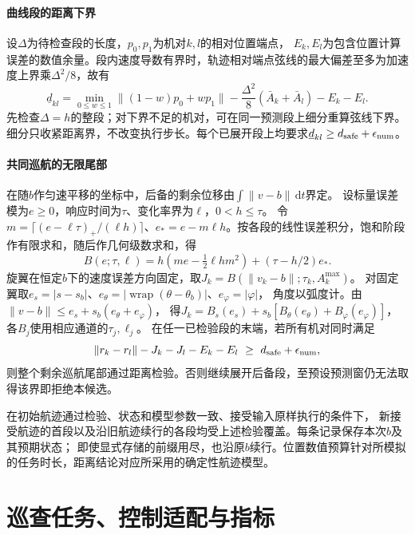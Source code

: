 \documentclass[UTF8,a4paper,11pt,fontset=none]{ctexart}
\begin{document}
\paragraph{曲线段的距离下界}
设$\Delta$为待检查段的长度，$p_0,p_1$为机对$k,l$的相对位置端点，
$E_k,E_l$为包含位置计算误差的数值余量。段内速度导数有界时，轨迹相对端点弦线的最大偏差至多为加速度上界乘$\Delta^2/8$，故有
\begin{equation}
\underline d_{kl}=\min_{0\le w\le1}\|(1-w)p_0+wp_1\|
-\frac{\Delta^2}{8}(\bar A_k+\bar A_l)-E_k-E_l .
\label{eq:segment-bound}
\end{equation}
先检查$\Delta=h$的整段；对下界不足的机对，可在同一预测段上细分重算弦线下界。
细分只收紧距离界，不改变执行步长。每个已展开段上均要求$\underline d_{kl}\ge d_{\rm safe}+\epsilon_{\rm num}$。

\paragraph{共同巡航的无限尾部}
在随$b$作匀速平移的坐标中，后备的剩余位移由$\int\|v-b\|\,\mathrm dt$界定。
设标量误差模为$e\ge0$，响应时间为$\tau$、变化率界为$\ell$，$0<h\le\tau$。
令$m=\lceil(e-\ell\tau)_+/(\ell h)\rceil$、$e_*=e-m\ell h$。按各段的线性误差积分，饱和阶段作有限求和，随后作几何级数求和，得
\begin{equation}
B(e;\tau,\ell)=h(me-\tfrac12\ell h m^2)+(\tau-h/2)e_* .
\label{eq:braking-path}
\end{equation}
旋翼在恒定$b$下的速度误差方向固定，取$J_k=B(\|v_k-b\|;\tau_k,A_k^{\max})$。
对固定翼取$e_s=|s-s_b|$、$e_\theta=|\operatorname{wrap}(\theta-\theta_b)|$、$e_\varphi=|\varphi|$，
角度以弧度计。由$\|v-b\|\le e_s+s_b(e_\theta+e_\varphi)$，
得$J_k=B_s(e_s)+s_b[B_\theta(e_\theta)+B_\varphi(e_\varphi)]$，各$B_j$使用相应通道的$\tau_j,\ell_j$。
在任一已检验段的末端，若所有机对同时满足
\[
\|r_k-r_l\|-J_k-J_l-E_k-E_l\ \ge\ d_{\rm safe}+\epsilon_{\rm num},
\]
则整个剩余巡航尾部通过距离检验。否则继续展开后备段，至预设预测窗仍无法取得该界即拒绝本候选。

在初始航迹通过检验、状态和模型参数一致、接受输入原样执行的条件下，
新接受航迹的首段以及沿旧航迹续行的各段均受上述检验覆盖。每条记录保存本次$b$及其预期状态；
即使显式存储的前缀用尽，也沿原$b$续行。位置数值预算针对所模拟的任务时长，距离结论对应所采用的确定性航迹模型。

\section{巡查任务、控制适配与指标}\label{app:external}
\end{document}
